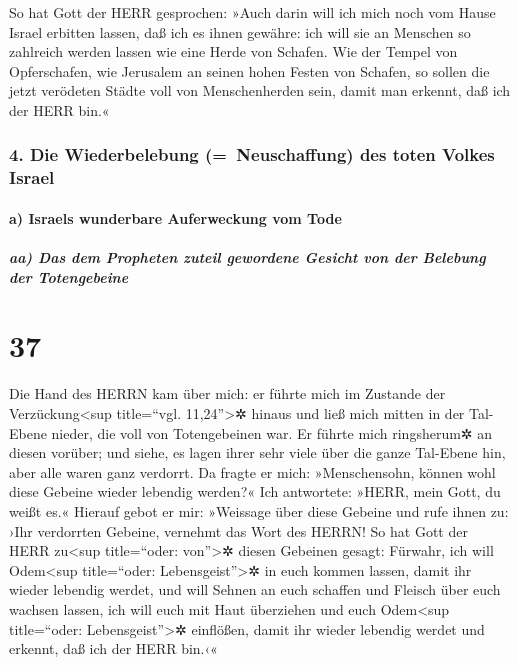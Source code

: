 So hat Gott der HERR gesprochen: »Auch darin will ich
mich noch vom Hause Israel erbitten lassen, daß ich es ihnen gewähre:
ich will sie an Menschen so zahlreich werden lassen wie eine Herde von
Schafen. Wie der Tempel von Opferschafen, wie Jerusalem
an seinen hohen Festen von Schafen, so sollen die jetzt verödeten Städte
voll von Menschenherden sein, damit man erkennt, daß ich der HERR bin.«

\hypertarget{die-wiederbelebung-neuschaffung-des-toten-volkes-israel}{%
\subsubsection{4. Die Wiederbelebung (=~Neuschaffung) des toten Volkes
Israel}\label{die-wiederbelebung-neuschaffung-des-toten-volkes-israel}}

\hypertarget{a-israels-wunderbare-auferweckung-vom-tode}{%
\paragraph{a) Israels wunderbare Auferweckung vom
Tode}\label{a-israels-wunderbare-auferweckung-vom-tode}}

\hypertarget{aa-das-dem-propheten-zuteil-gewordene-gesicht-von-der-belebung-der-totengebeine}{%
\subparagraph{aa) Das dem Propheten zuteil gewordene Gesicht von der
Belebung der
Totengebeine}\label{aa-das-dem-propheten-zuteil-gewordene-gesicht-von-der-belebung-der-totengebeine}}

\hypertarget{section-36}{%
\section{37}\label{section-36}}

Die Hand des HERRN kam über mich: er führte mich im
Zustande der Verzückung\textless sup title=``vgl. 11,24''\textgreater✲
hinaus und ließ mich mitten in der Tal-Ebene nieder, die voll von
Totengebeinen war. Er führte mich ringsherum✲ an diesen
vorüber; und siehe, es lagen ihrer sehr viele über die ganze Tal-Ebene
hin, aber alle waren ganz verdorrt. Da fragte er mich:
»Menschensohn, können wohl diese Gebeine wieder lebendig werden?« Ich
antwortete: »HERR, mein Gott, du weißt es.« Hierauf gebot
er mir: »Weissage über diese Gebeine und rufe ihnen zu: ›Ihr verdorrten
Gebeine, vernehmt das Wort des HERRN! So hat Gott der HERR
zu\textless sup title=``oder: von''\textgreater✲ diesen Gebeinen gesagt:
Fürwahr, ich will Odem\textless sup title=``oder:
Lebensgeist''\textgreater✲ in euch kommen lassen, damit ihr wieder
lebendig werdet, und will Sehnen an euch schaffen und
Fleisch über euch wachsen lassen, ich will euch mit Haut überziehen und
euch Odem\textless sup title=``oder: Lebensgeist''\textgreater✲
einflößen, damit ihr wieder lebendig werdet und erkennt, daß ich der
HERR bin.‹«

